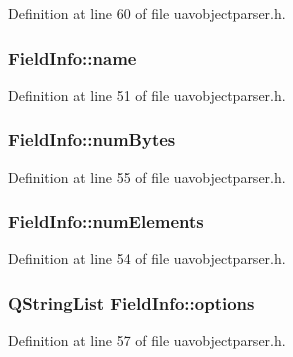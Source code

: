 Definition at line 60 of file uavobjectparser.\-h.

\hypertarget{struct_field_info_afca58915a68fecfa045738e2fe98e670}{
\subsubsection[{name}]{ Field\-Info\-::name}}\label{struct_field_info_afca58915a68fecfa045738e2fe98e670}


Definition at line 51 of file uavobjectparser.\-h.

\hypertarget{struct_field_info_a8f7c0cc23d2078b4c22fcfff86577ba6}{
\subsubsection[{num\-Bytes}]{ Field\-Info\-::num\-Bytes}}\label{struct_field_info_a8f7c0cc23d2078b4c22fcfff86577ba6}


Definition at line 55 of file uavobjectparser.\-h.

\hypertarget{struct_field_info_a5102b52d6aea7eff9a1578fee7024039}{
\subsubsection[{num\-Elements}]{ Field\-Info\-::num\-Elements}}\label{struct_field_info_a5102b52d6aea7eff9a1578fee7024039}


Definition at line 54 of file uavobjectparser.\-h.

\hypertarget{struct_field_info_ae593af22164dd683eb9b98e91dd5029e}{
\subsubsection[{options}]{\setlength{\rightskip}{0pt plus 5cm}Q\-String\-List Field\-Info\-::options}}\label{struct_field_info_ae593af22164dd683eb9b98e91dd5029e}


Definition at line 57 of file uavobjectparser.\-h.

